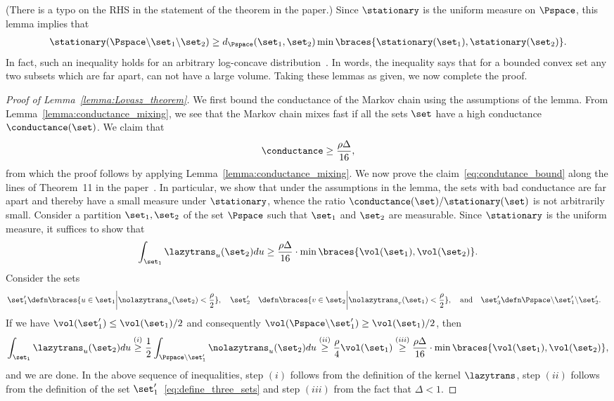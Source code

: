 (There is a typo on the RHS in the statement of the theorem in the paper.)
Since $\stationary$ is the uniform measure on $\Pspace$, this lemma implies that
\begin{align}
	\stationary(\Pspace \backslash \set_1  \backslash \set_2) \geq d_\Pspace(\set_1, \set_2) \min\braces{\stationary(\set_1), \stationary(\set_2)}.
	\label{eq:isoperimetry}
\end{align}
In fact, such an inequality holds for an arbitrary log-concave distribution~\cite{lovasz2003hit}.
In words, the inequality says that for a bounded convex set any two subsets which are far apart, can not have a large volume.
Taking these lemmas as given, we now complete the proof.

\begin{proof}[Proof of Lemma~\ref{lemma:Lovasz_theorem}]
	We first bound the conductance of the Markov chain using the assumptions of the lemma.
From Lemma~\ref{lemma:conductance_mixing}, we see that the Markov chain mixes fast if all the sets $\set$ have a high conductance $\conductance(\set)$.
We claim that
\begin{align}
	\label{eq:condutance_bound}
	\conductance \geq \frac{\rho \Delta}{16},
\end{align}
from which the proof follows by applying Lemma~\ref{lemma:conductance_mixing}.
We now prove the claim~\eqref{eq:condutance_bound} along the lines of Theorem~11 in the paper~\cite{lovasz1999hit}.
In particular, we show that under the assumptions in the lemma, the sets with bad conductance are far apart and thereby have a small measure under $\stationary$, whence the ratio $\conductance(\set)/\stationary(\set)$ is not arbitrarily small.
Consider a partition $\set_1, \set_2$ of the set $\Pspace$ such that $\set_1$ and $\set_2$ are measurable.
Since $\stationary$ is the uniform measure, it suffices to show that
\begin{align*}
	\int_{\set_1} \lazytrans_u(\set_2) du \geq  \frac{\rho \Delta}{16} \cdot \min\braces{\vol(\set_1), \vol(\set_2)}.
\end{align*}
Consider the sets
\begin{align}
	\set_1' &\defn \braces{ u \in \set_1 \bigg\vert \nolazytrans_u(\set_2) < \frac{\rho}{2} },\quad
	\set_2' &\defn  \braces{ v \in \set_2 \bigg\vert \nolazytrans_v(\set_1) < \frac{\rho}{2} }, \quad \text{and}\quad
	\set_3' &\defn \Pspace \backslash \set_1' \backslash \set_2'.
	\label{eq:define_three_sets}
\end{align}
If we have $\vol(\set_1') \leq \vol(\set_1)/2$ and consequently $\vol(\Pspace \backslash \set_1') \geq \vol(\set_1)/2$, then
\begin{align*}
	\int_{\set_1} \lazytrans_u(\set_2) du
	\stackrel{(i)}{\geq} \frac{1}{2} \int_{\Pspace \backslash \set_1'} \nolazytrans_u(\set_2) du
	\stackrel{(ii)}{\geq} \frac{\rho}{4}  \vol(\set_1)
	\stackrel{(iii)}{\geq} \frac{\rho\Delta}{16} \cdot \min\braces{\vol(\set_1), \vol(\set_2)},
\end{align*}
and we are done.
In the above sequence of inequalities, step $(i)$ follows from the definition of the kernel $\lazytrans$, step $(ii) $ follows from the definition of the set $\set_1'$~\eqref{eq:define_three_sets} and step $(iii)$ from the fact that $\Delta < 1 $.


\end{proof}
